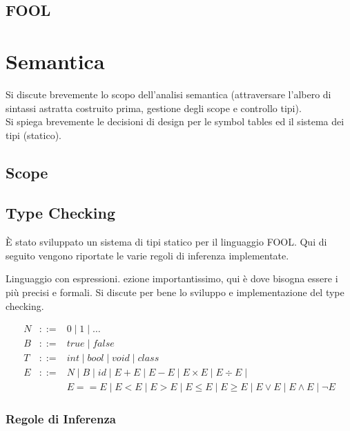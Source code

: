 \documentclass{scrreprt}
\begin{document}
\section{FOOL}

\chapter{Semantica}
Si discute brevemente lo scopo dell'analisi semantica (attraversare l'albero di sintassi astratta costruito prima, gestione
degli scope e controllo tipi).\\
Si spiega brevemente le decisioni di design per le symbol tables ed il sistema dei tipi (statico).
\section{Scope}

\section{Type Checking}
È stato sviluppato un sistema di tipi statico per il linguaggio FOOL. Qui di seguito vengono riportate le varie regoli di inferenza implementate.

Linguaggio con espressioni. ezione importantissimo, qui è dove bisogna essere i più precisi e formali. Si discute per bene lo sviluppo
e implementazione del type checking.

\[
\begin{array}{lcl}
N & ::= & 0 \mid 1 \mid \dots\\ 
B & ::= &  true \mid false \\
T & ::= & int \mid bool \mid void \mid class\\
E & ::= & N \mid B \mid id \mid E + E \mid E - E \mid E \times E \mid E \div E \mid\\
& & E == E \mid E < E \mid E > E \mid E \le E \mid E \ge E \mid E \lor E \mid E \land E \mid \lnot E
\end{array}
\]

\subsection{Regole di Inferenza}
\end{document}
